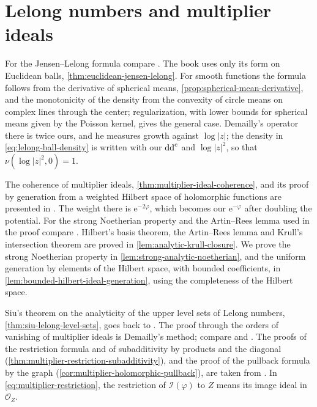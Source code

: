 \section{Lelong numbers and multiplier ideals}
\label{sec:history-lelong-multiplier}
For the Jensen--Lelong formula compare \cite[Chapter III, (6.1)--(6.11)]{DemBook}. The book uses only its form on Euclidean balls, \cref{thm:euclidean-jensen-lelong}. For smooth functions the formula follows from the derivative of spherical means, \cref{prop:spherical-mean-derivative}, and the monotonicity of the density from the convexity of circle means on complex lines through the center; regularization, with lower bounds for spherical means given by the Poisson kernel, gives the general case. Demailly's operator there is twice ours, and he measures growth against $\log|z|$; the density in \eqref{eq:lelong-ball-density} is written with our $\mathrm{dd}^{\mathrm{c}}$ and $\log|z|^2$, so that $\nu(\log|z|^2,0)=1$.

The coherence of multiplier ideals, \cref{thm:multiplier-ideal-coherence}, and its proof by generation from a weighted Hilbert space of holomorphic functions are presented in \cite[Proposition 5.7]{DemAnalyticOnline}. The weight there is $\mathrm e^{-2\varphi}$, which becomes our $\mathrm e^{-\varphi}$ after doubling the potential. For the strong Noetherian property and the Artin--Rees lemma used in the proof compare \cite[Chapter II, (3.22), and Chapter IX, (1.1)--(1.3)]{DemBook}. Hilbert's basis theorem, the Artin--Rees lemma and Krull's intersection theorem are proved in \cref{lem:analytic-krull-closure}. We prove the strong Noetherian property in \cref{lem:strong-analytic-noetherian}, and the uniform generation by elements of the Hilbert space, with bounded coefficients, in \cref{lem:bounded-hilbert-ideal-generation}, using the completeness of the Hilbert space.

Siu's theorem on the analyticity of the upper level sets of Lelong numbers, \cref{thm:siu-lelong-level-sets}, goes back to \cite{Siu74}. The proof through the orders of vanishing of multiplier ideals is Demailly's method; compare \cite[Corollary 14.3]{DemAnalyticOnline} and \cite[Theorem 10.2 and Lemma 10.3]{Bou23Notes}. The proofs of the restriction formula and of subadditivity by products and the diagonal (\cref{thm:multiplier-restriction-subadditivity}), and the proof of the pullback formula by the graph (\cref{cor:multiplier-holomorphic-pullback}), are taken from \cite[(15.1)--(15.3)]{DemAnalyticOnline}. In \eqref{eq:multiplier-restriction}, the restriction of $\mathcal I(\varphi)$ to $Z$ means its image ideal in $\mathcal O_Z$.

